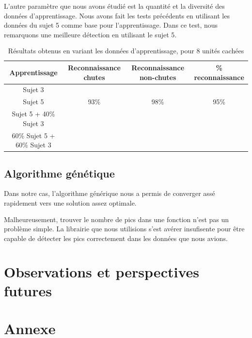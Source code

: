 \documentclass[12pt,letterpaper]{article}
\begin{document}
L'autre paramètre que nous avons étudié est la quantité et la diversité des données d'apprentissage. Nous avons fait les tests précédents en utilisant les données du sujet 5 comme base pour l'apprentissage. Dans ce test, nous remarquons une meilleure détection en utilisant le sujet 5.

\begin{table}
\centering
\begin{tabular}{|c|c|c|c|}
    \hline
    Apprentissage & Reconnaissance chutes & Reconnaissance non-chutes & \% reconnaissance \\ \hline
    Sujet 3 &  &  &   \\ \hline
    Sujet 5 & 93\%  & 98\% & 95\% \\ \hline
    Sujet 5 + 40\% Sujet 3 &  &  &  \\ \hline
    60\% Sujet 5 + 60\% Sujet 3 & & & \\ \hline
\end{tabular}
\caption{Résultats obtenus en variant les données d'apprentissage, pour 8 unités cachées}
\label{tbl:neural_results}
\end{table}
\subsection{Algorithme génétique}

Dans notre cas, l'algorithme générique nous a permis de converger assé rapidement vers une solution assez optimale. 

Malheureusement, trouver le nombre de pics dans une fonction n'est pas un problème simple. La librairie que nous utilisions 
s'est avérer insufisente pour être capable de détecter les pics correctement dans les données que nous avions. 


\section{Observations et perspectives futures}

\pagebreak
\section{Annexe}
\end{document}

